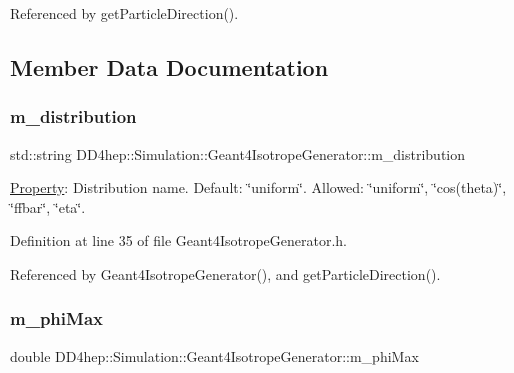 Referenced by get\+Particle\+Direction().



\subsection{Member Data Documentation}
\hypertarget{class_d_d4hep_1_1_simulation_1_1_geant4_isotrope_generator_a06a94fc1f4b02b112f0b56ced43b2f6b}{}\label{class_d_d4hep_1_1_simulation_1_1_geant4_isotrope_generator_a06a94fc1f4b02b112f0b56ced43b2f6b} 
\subsubsection{\texorpdfstring{m\+\_\+distribution}{m\_distribution}}
{\footnotesize\ttfamily std\+::string D\+D4hep\+::\+Simulation\+::\+Geant4\+Isotrope\+Generator\+::m\+\_\+distribution\hspace{0.3cm}{\ttfamily [protected]}}



\hyperlink{class_d_d4hep_1_1_property}{Property}\+: Distribution name. Default\+: \char`\"{}uniform\char`\"{}. Allowed\+: \char`\"{}uniform\char`\"{}, \char`\"{}cos(theta)\char`\"{}, \char`\"{}ffbar\char`\"{}, \char`\"{}eta\char`\"{}. 



Definition at line 35 of file Geant4\+Isotrope\+Generator.\+h.



Referenced by Geant4\+Isotrope\+Generator(), and get\+Particle\+Direction().

\hypertarget{class_d_d4hep_1_1_simulation_1_1_geant4_isotrope_generator_a72d8e77fc0bb2c1160d2266c02fa82ef}{}\label{class_d_d4hep_1_1_simulation_1_1_geant4_isotrope_generator_a72d8e77fc0bb2c1160d2266c02fa82ef} 
\subsubsection{\texorpdfstring{m\+\_\+phi\+Max}{m\_phiMax}}
{\footnotesize\ttfamily double D\+D4hep\+::\+Simulation\+::\+Geant4\+Isotrope\+Generator\+::m\+\_\+phi\+Max\hspace{0.3cm}{\ttfamily [protected]}}




